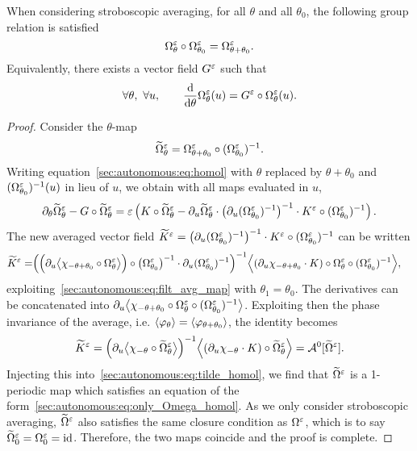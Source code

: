 \begin{proposition} \label{sec:autonomous:prop:phigroup} %
  When considering stroboscopic averaging, for all $\theta$ and all
  $\theta_0$, the following group relation is satisfied 
  $$
    \Omega^{\varepsilon}_{\theta} \circ \Omega^{\varepsilon}_{\theta_0} 
    = \Omega^{\varepsilon}_{\theta + \theta_0}.
  $$
  Equivalently, there exists a vector field $G^{\varepsilon}$ such that 
  $$
  \forall \theta, \ \forall u, \qquad 
  \frac{\mathrm{d}}{\mathrm{d} \theta} \Omega^{\varepsilon}_\theta(u) 
  = G^{\varepsilon} \circ \Omega^{\varepsilon}_\theta(u).
  $$
\end{proposition}
\begin{proof}
Consider the $\theta$-map  
$$
\widetilde \Omega^{\varepsilon}_{\theta} 
= \Omega^{\varepsilon}_{\theta+\theta_0} \circ (\Omega^{\varepsilon}_{\theta_0})^{-1}.
$$
Writing equation~\eqref{sec:autonomous:eq:homol} with $\theta$ replaced by
$\theta+\theta_0$ and $(\Omega^{\varepsilon}_{\theta_0})^{-1}(u)$ in lieu of $u$,
we obtain with all maps evaluated in $u$, 
\begin{equation} \label{sec:autonomous:eq:tilde_homol}
  \partial_\theta \widetilde\Omega^{\varepsilon}_{\theta}
  - G \circ \widetilde \Omega^{\varepsilon}_{\theta}
  = \varepsilon\left( K \circ \widetilde \Omega^{\varepsilon}_{\theta}
    - \partial_u \widetilde \Omega^{\varepsilon}_{\theta} \cdot 
      \left(\partial_u (\Omega^{\varepsilon}_{\theta_0})^{-1} \right)^{-1} \cdot 
      K^{\varepsilon} \circ (\Omega^{\varepsilon}_{\theta_0})^{-1} 
  \right) .
\end{equation}
The new averaged vector field $\widetilde{K}^{\varepsilon} = \left(\partial_u
(\Omega^{\varepsilon}_{\theta_0})^{-1}\right)^{-1} \cdot K^{\varepsilon} \circ
(\Omega^{\varepsilon}_{\theta_0})^{-1} $ can be written 
\begin{align*}
  \widetilde{K}^{\varepsilon} = &
  \Big( \Big( \partial_u \big \langle \chi_{-\theta+\theta_0} 
      \circ \Omega^{\varepsilon} _\theta \big \rangle \Big) 
    \circ \big( \Omega^{\varepsilon}_{\theta_0} \big)^{-1} \cdot
    \partial_u (\Omega^{\varepsilon}_{\theta_0})^{-1} \Big) ^{-1}
  \Big \langle (\partial_u \chi_{-\theta+\theta_0} \cdot K) 
    \circ \Omega^{\varepsilon} _\theta  \circ (\Omega^{\varepsilon}_{\theta_0})^{-1} \Big \rangle ,
\end{align*}
exploiting~\eqref{sec:autonomous:eq:filt_avg_map} with $\theta_1 =
\theta_0$. The derivatives can be concatenated into $\partial_u \big \langle
\chi_{-\theta + \theta_0} \circ \Omega^{\varepsilon} _\theta \circ (\Omega^{\varepsilon}
_{\theta_0})^{-1} \big \rangle$. Exploiting then the phase invariance of the
average, i.e. $\langle \varphi_{\theta} \rangle = \langle \varphi_{\theta + \theta_0}
\rangle$, the identity becomes 
\begin{equation*}
  \widetilde{K}^{\varepsilon} =
  \Big( \partial_u \big \langle \chi_{-\theta} 
    \circ \widetilde\Omega^{\varepsilon} _\theta \big \rangle \Big) ^{-1}
  \Big \langle (\partial_u \chi_{-\theta} \cdot K) 
    \circ \widetilde\Omega^{\varepsilon} _\theta \Big \rangle 
  = \mathcal{A}^{0}[\widetilde{\Omega}^{\varepsilon}] .
\end{equation*}
Injecting this into~\eqref{sec:autonomous:eq:tilde_homol}, we find that
$\widetilde{\Omega}^{\varepsilon}$ is a 1-periodic map which satisfies an equation
of the form~\eqref{sec:autonomous:eq:only_Omega_homol}. As we only
consider stroboscopic averaging, $\widetilde{\Omega}^{\varepsilon}$ also satisfies
the same closure condition as $\Omega^{\varepsilon}$, which is to say
$\widetilde\Omega^{\varepsilon} _0 = \Omega^{\varepsilon} _0 = \operatorname{id}$. Therefore, the two maps
coincide and the proof is complete. 

\end{proof}
